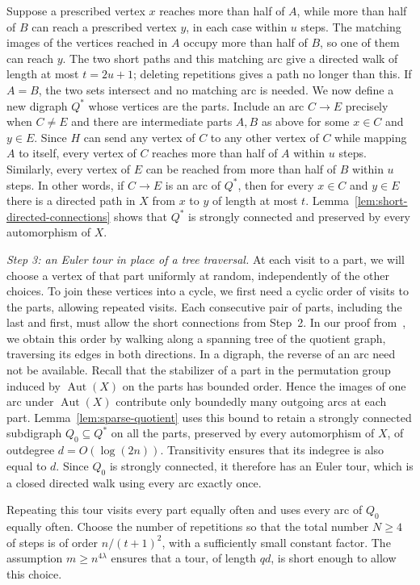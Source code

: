 \documentclass[11pt,a4paper,reqno]{amsart}
\theoremstyle{definition}
\theoremstyle{remark}
\numberwithin{equation}{section}
\DeclareMathOperator{\Aut}{Aut}
\begin{document}
Suppose a prescribed vertex $x$ reaches more than half of $A$, while more than half of $B$ can reach a prescribed vertex $y$, in each case within $u$ steps. The matching images of the vertices reached in $A$ occupy more than half of $B$, so one of them can reach $y$. The two short paths and this matching arc give a directed walk of length at most $t=2u+1$; deleting repetitions gives a path no longer than this. If $A=B$, the two sets intersect and no matching arc is needed. We now define a new digraph $Q^*$ whose vertices are the parts. Include an arc $C\to E$ precisely when $C\ne E$ and there are intermediate parts $A,B$ as above for some $x\in C$ and $y\in E$. Since $H$ can send any vertex of $C$ to any other vertex of $C$ while mapping $A$ to itself, every vertex of $C$ reaches more than half of $A$ within $u$ steps. Similarly, every vertex of $E$ can be reached from more than half of $B$ within $u$ steps. In other words, if $C\to E$ is an arc of $Q^*$, then for every $x\in C$ and $y\in E$ there is a directed path in $X$ from $x$ to $y$ of length at most $t$. Lemma~\ref{lem:short-directed-connections} shows that $Q^*$ is strongly connected and preserved by every automorphism of $X$.

\smallskip
\noindent\emph{Step 3: an Euler tour in place of a tree traversal.}
At each visit to a part, we will choose a vertex of that part uniformly at random, independently of the other choices. To join these vertices into a cycle, we first need a cyclic order of visits to the parts, allowing repeated visits. Each consecutive pair of parts, including the last and first, must allow the short connections from Step~2. In our proof from~\cite[Section 4]{LiMethuku}, we obtain this order by walking along a spanning tree of the quotient graph, traversing its edges in both directions. In a digraph, the reverse of an arc need not be available. Recall that the stabilizer of a part in the permutation group induced by $\Aut(X)$ on the parts has bounded order. Hence the images of one arc under $\Aut(X)$ contribute only boundedly many outgoing arcs at each part. Lemma~\ref{lem:sparse-quotient} uses this bound to retain a strongly connected subdigraph $Q_0\subseteq Q^*$ on all the parts, preserved by every automorphism of $X$, of outdegree $d=O(\log(2n))$. Transitivity ensures that its indegree is also equal to $d$. Since $Q_0$ is strongly connected, it therefore has an Euler tour, which is a closed directed walk using every arc exactly once.

Repeating this tour visits every part equally often and uses every arc of $Q_0$ equally often. Choose the number of repetitions so that the total number $N\ge4$ of steps is of order $n/(t+1)^2$, with a sufficiently small constant factor. The assumption $m\ge n^{4\lambda}$ ensures that a tour, of length $qd$, is short enough to allow this choice.
\end{document}

